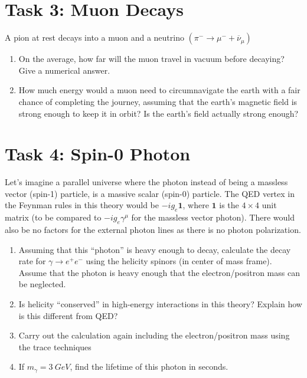 \documentclass[12pt]{article}
\begin{document}
\newpage
\section*{Task 3: Muon Decays}
\begin{problem}
  A pion at rest decays into a muon and a neutrino $(\pi^-\to\mu^-+\overline{\nu}_\mu)$
  \begin{enumerate}
  \item On the average, how far will the muon travel in vacuum before decaying? Give a numerical answer. 
  \item How much energy would a muon need to circumnavigate the earth with a fair chance of completing the journey, assuming that the earth's magnetic field is strong enough to keep it in orbit? Is the earth's field actually strong enough?
  \end{enumerate}
\end{problem}

\newpage
\section*{Task 4: Spin-0 Photon}
\begin{problem}
  Let's imagine a parallel universe where the photon instead of being a massless vector (spin-1) particle, is a massive scalar (spin-0) particle. The QED vertex in the Feynman rules in this theory would be $-ig_e\bm{1}$, where $\bm{1}$ is the $4\times4$ unit matrix (to be compared to $-ig_e\gamma^\mu$ for the massless vector photon). There would also be no factors for the external photon lines as there is no photon polarization.
  \begin{enumerate}
  \item Assuming that this ``photon'' is heavy enough to decay, calculate the decay rate for $\gamma\to e^+e^-$ using the helicity spinors (in center of mass frame). Assume that the photon is heavy enough that the electron/positron mass can be neglected. 
  \item Is helicity ``conserved'' in high-energy interactions in this theory? Explain how is this different from QED?
  \item Carry out the calculation again including the electron/positron mass using the trace techniques
  \item If $m_\gamma=\SI{3}{GeV}$, find the lifetime of this photon in seconds.
  \end{enumerate}
\end{problem}
\end{document}
